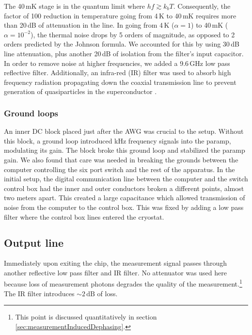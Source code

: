 The 40\,mK stage is in the quantum limit where $hf \gtrsim k_b T$.
Consequently, the factor of 100 reduction in temperature going from 4\,K to 40\,mK requires more than 20\,dB of attenuation in the line.
In going from 4\,K ($\alpha=1$) to 40\,mK ($\alpha = 10^{-2}$), the thermal noise drops by 5 orders of magnitude, as opposed to 2 orders predicted by the Johnson formula.
We accounted for this by using 30\,dB line attenuation, plus another 20\,dB of isolation from the filter's input capacitor.
In order to remove noise at higher frequencies, we added a 9.6\,GHz low pass reflective filter.
Additionally, an infra-red (IR) filter was used to absorb high frequency radiation propagating down the coaxial transmission line to prevent generation of quasiparticles in the superconductor \cite{Barends:radiation2011}.

\subsubsection{Ground loops}

An inner DC block placed just after the AWG was crucial to the setup.
Without this block, a ground loop introduced kHz frequency signals into the paramp, modulating its gain.
The block broke this ground loop and stabilized the paramp gain.
We also found that care was needed in breaking the grounds between the computer controlling the six port switch and the rest of the apparatus.
In the initial setup, the digital communication line between the computer and the switch control box had the inner and outer conductors broken a different points, almost two meters apart.
This created a large capacitance which allowed transmission of noise from the computer to the control box.
This was fixed by adding a low pass filter where the control box lines entered the cryostat.


\subsection{Output line}

Immediately upon exiting the chip, the measurement signal passes through another reflective low pass filter and IR filter.
No attenuator was used here because loss of measurement photons degrades the quality of the measurement.\footnote{This point is discussed quantitatively in section \ref{sec:measurementInducedDephasing}.} The IR filter introduces $\sim 2\,\text{dB}$ of loss.

